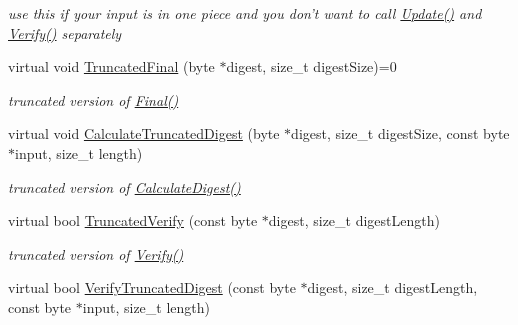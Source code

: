 \begin{DoxyCompactItemize}
\begin{DoxyCompactList}\small\item\em use this if your input is in one piece and you don't want to call \hyperlink{class_hash_transformation_aafabefaf445b65d3ba0d8e1c0294afe5}{Update()} and \hyperlink{class_hash_transformation_a16c4aecd047015d513feef4ed5b929ba}{Verify()} separately \item\end{DoxyCompactList}\item 
\hypertarget{class_hash_transformation_a590ecda344aa0fb045abf42ec08823b2}{
virtual void \hyperlink{class_hash_transformation_a590ecda344aa0fb045abf42ec08823b2}{TruncatedFinal} (byte $\ast$digest, size\_\-t digestSize)=0}
\label{class_hash_transformation_a590ecda344aa0fb045abf42ec08823b2}

\begin{DoxyCompactList}\small\item\em truncated version of \hyperlink{class_hash_transformation_aa0b8c7a110d8968268fd02ec32b9a8e8}{Final()} \item\end{DoxyCompactList}\item 
\hypertarget{class_hash_transformation_a0b6917657eaec935750fd83e28270d76}{
virtual void \hyperlink{class_hash_transformation_a0b6917657eaec935750fd83e28270d76}{CalculateTruncatedDigest} (byte $\ast$digest, size\_\-t digestSize, const byte $\ast$input, size\_\-t length)}
\label{class_hash_transformation_a0b6917657eaec935750fd83e28270d76}

\begin{DoxyCompactList}\small\item\em truncated version of \hyperlink{class_hash_transformation_af8124c4fca23b74bbdc43660bdae692c}{CalculateDigest()} \item\end{DoxyCompactList}\item 
\hypertarget{class_hash_transformation_ad9ff5cb223a3771412b78b33242f3629}{
virtual bool \hyperlink{class_hash_transformation_ad9ff5cb223a3771412b78b33242f3629}{TruncatedVerify} (const byte $\ast$digest, size\_\-t digestLength)}
\label{class_hash_transformation_ad9ff5cb223a3771412b78b33242f3629}

\begin{DoxyCompactList}\small\item\em truncated version of \hyperlink{class_hash_transformation_a16c4aecd047015d513feef4ed5b929ba}{Verify()} \item\end{DoxyCompactList}\item 
\hypertarget{class_hash_transformation_a7958e99717019e8b9f91672bdfe9e086}{
virtual bool \hyperlink{class_hash_transformation_a7958e99717019e8b9f91672bdfe9e086}{VerifyTruncatedDigest} (const byte $\ast$digest, size\_\-t digestLength, const byte $\ast$input, size\_\-t length)}
\label{class_hash_transformation_a7958e99717019e8b9f91672bdfe9e086}


\end{DoxyCompactItemize}
